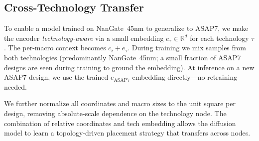 \subsection{Cross-Technology Transfer}
\label{ssec:cross_pdk}

To enable a model trained on NanGate~45nm to generalize to ASAP7, we make the encoder \emph{technology-aware} via a small embedding $e_\tau \in \mathbb{R}^d$ for each technology $\tau$. The per-macro context becomes $c_i + e_\tau$. During training we mix samples from both technologies (predominantly NanGate~45nm; a small fraction of ASAP7 designs are seen during training to ground the embedding). At inference on a new ASAP7 design, we use the trained $e_\textrm{ASAP7}$ embedding directly—no retraining needed.

We further normalize all coordinates and macro sizes to the unit square per design, removing absolute-scale dependence on the technology node. The combination of relative coordinates and tech embedding allows the diffusion model to learn a topology-driven placement strategy that transfers across nodes.
